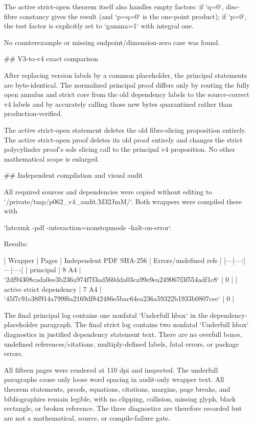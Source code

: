 The active strict-open theorem itself also handles empty factors: if `q=0`,
disc-fibre constancy gives the result (and `p=q=0` is the one-point product);
if `p=0`, the test factor is explicitly set to `gamma=1` with integral one.

No counterexample or missing endpoint/dimension-zero case was found.

## V3-to-v4 exact comparison

After replacing version labels by a common placeholder, the principal
statements are byte-identical.  The normalized principal proof differs only
by routing the fully open annulus and strict core from the old dependency
labels to the source-correct v4 labels and by accurately calling those new
bytes quarantined rather than production-verified.

The active strict-open statement deletes the old fibre-slicing proposition
entirely.  The active strict-open proof deletes its old proof entirely and
changes the strict polycylinder proof's sole slicing call to the principal v4
proposition.  No other mathematical scope is enlarged.

## Independent compilation and visual audit

All required sources and dependencies were copied without editing to
`/private/tmp/p062_v4_audit.M32JmM/`.  Both wrappers were compiled there with

`latexmk -pdf -interaction=nonstopmode -halt-on-error`.

Results:

| Wrapper | Pages | Independent PDF SHA-256 | Errors/undefined refs |
|---|---:|---|---:|
| principal | 8 A4 | `2df94308cada0ee3b236a974f7f3ad560dda03ca99e9ea249067f3f554adf1c8` | 0 |
| active strict dependency | 7 A4 | `45f7c91c38f914a799f6a2169df842486e5bac64ea236a59322b1933b0807cec` | 0 |

The final principal log contains one nonfatal `Underfull hbox` in the
dependency-placeholder paragraph.  The final strict log contains two
nonfatal `Underfull hbox` diagnostics in justified dependency statement text.
There are no overfull boxes, undefined references/citations, multiply-defined
labels, fatal errors, or package errors.

All fifteen pages were rendered at 110 dpi and inspected.  The underfull
paragraphs cause only loose word spacing in audit-only wrapper text.  All
theorem statements, proofs, equations, citations, margins, page breaks, and
bibliographies remain legible, with no clipping, collision, missing glyph,
black rectangle, or broken reference.  The three diagnostics are therefore
recorded but are not a mathematical, source, or compile-failure gate.


